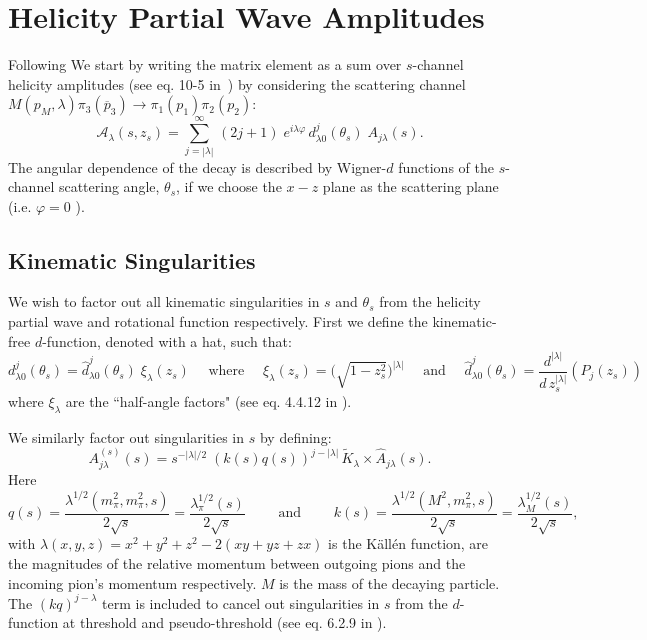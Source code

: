 \documentclass[10pt, aps,prd,amsmath,amssymb,superscriptaddress,onecolumn,
nofootinbib,showpacs,preprintnumbers]{revtex4-1}
\begin{document}
\section{Helicity Partial Wave Amplitudes} \label{sec:helicity}
Following \cite{Mikhasenko:2017rkh} We start by writing the matrix element as a sum over \(s\)-channel helicity amplitudes (see eq. 10-5 in~\cite{perl}) by considering the scattering channel \(M(p_M, \lambda) \pi_3(\overline{p}_3) \to  \pi_1(p_1)\pi_2(p_2)\):
  \begin{equation}
    \label{eq:helicity}
    \mathcal{A}_\lambda(s,z_s) = \sum_{j= |\lambda|}^\infty \, (2j +1) \; e^{i\lambda\varphi} \, d_{\lambda0}^j(\theta_s) \; A_{j \lambda}(s).
  \end{equation}
The angular dependence of the decay is described by Wigner-\(d\) functions of the \(s\)-channel scattering angle, \(\theta_s\), if we choose the \(x-z\) plane as the scattering plane (i.e. \(\varphi = 0 \) ).
\subsection{Kinematic Singularities}
\label{sec:kin-singularities}
We wish to factor out all kinematic singularities in \(s\) and \(\theta_s\) from the helicity partial wave and rotational function respectively. First we define the kinematic-free \(d\)-function, denoted with a hat, such that:
  \begin{equation}
      \label{eq:halfangle}
      d^j_{\lambda 0}(\theta_s) = \hat{d}^j_{\lambda 0}(\theta_s) \; \xi_{\lambda}(z_s)
       \quad \text{ where } \quad
      \xi_{\lambda}(z_s) = \bigg( \sqrt{ 1- z_s^2} \bigg)^{|\lambda|}
       \quad \text{ and } \quad
      \hat{d}^j_{\lambda 0}(\theta_s) = \frac{d^{|\lambda|}}{d \, z_s^{|\lambda|}} (P_j(z_s))
  \end{equation}
where \(\xi_{\lambda}\) are the ``half-angle factors" (see eq. 4.4.12 in \cite{Collins}).

We similarly factor out singularities in \(s\) by defining:
  \begin{equation}
    \label{eq:kinematicfreepartialwave}
    A^{(s)}_{j\lambda}(s) = s^{-|\lambda|/2} \;  (k(s)q(s))^{j - |\lambda|} \, \tilde{K}_{\lambda} \times \hat{A}_{j\lambda}(s).
  \end{equation}
Here
  \begin{equation}
    \label{eq:momenta}
    q(s) = \frac{\lambda^{1/2}(m_\pi^2, m_\pi^2, s)}{2\sqrt{s}} = \frac{\lambda_\pi^{1/2}(s)}{2\sqrt{s}}
     \qquad \text{ and } \qquad
     k(s) = \frac{\lambda^{1/2}(M^2, m_\pi^2, s)}{2\sqrt{s}} = \frac{\lambda_M^{1/2}(s)}{2\sqrt{s}} ,
  \end{equation}
with \(\lambda(x,y,z) = x^2 + y^2 + z^2 - 2 (xy + yz + zx)\) is the K\"{a}ll\'{e}n function, are the magnitudes of  the relative momentum between outgoing pions and the incoming pion's momentum respectively. \(M\) is the mass of the decaying particle. The \((kq)^{j-\lambda}\) term is included to cancel out singularities in \(s\) from the \(d\)-function at threshold and pseudo-threshold (see eq. 6.2.9 in \cite{Collins}).
\end{document}
